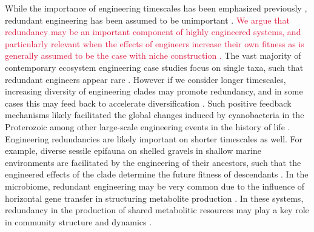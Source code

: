 \documentclass[twocolumn,preprintnumbers,amsmath,amssymb,superscriptaddress,linenumbers]{revtex4-1}
\newcommand{\rev}[1]{\textcolor{crimson}{#1}}
\begin{document}
While the importance of engineering timescales has been emphasized previously \cite{Hastings2007}, redundant engineering has been assumed to be unimportant \cite{Lawton1994}.
\rev{We argue that redundancy may be an important component of highly engineered systems, and particularly relevant when the effects of engineers increase their own fitness \cite{Cuddington2004} as is generally assumed to be the case with niche construction \cite{Krakauer2009}.}
The vast majority of contemporary ecosystem engineering case studies focus on single taxa, such that redundant engineers appear rare \cite{Lawton1994}.
However if we consider longer timescales, increasing diversity of engineering clades may promote redundancy, and in some cases this may feed back to accelerate diversification \cite{OdlingSmee2013b}.
Such positive feedback mechanisms likely facilitated the global changes induced by cyanobacteria in the Proterozoic \cite{Erwin2008,Schirrmeister2013} among other large-scale engineering events in the history of life \cite{Erwin2008}.
Engineering redundancies are likely important on shorter timescales as well.
For example, diverse sessile epifauna on shelled gravels in shallow marine environments are facilitated by the engineering of their ancestors, such that the engineered effects of the clade determine the future fitness of descendants \cite{Kidwell1986}.
In the microbiome, redundant engineering may be very common due to the influence of horizontal gene transfer in structuring metabolite production \cite{Polz2013}.
In these systems, redundancy in the production of shared metabolitic resources may play a key role in community structure and dynamics \cite{Kallus2017,Muscarella2017}.
\end{document}
